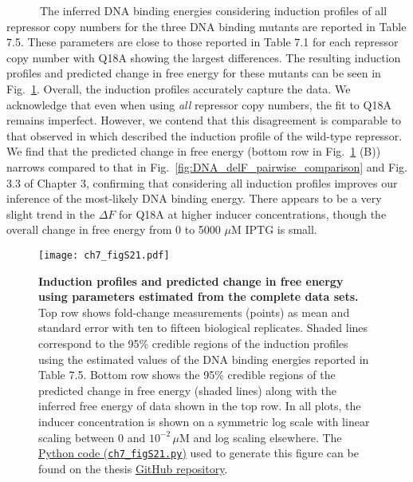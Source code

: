 \documentclass[12pt]{caltech_thesis}
\begin{document}
~~~~~~The inferred DNA binding energies considering induction profiles
of all repressor copy numbers for the three DNA binding mutants are
reported in Table 7.5. These parameters are close to those reported in
Table 7.1 for each repressor copy number with Q18A showing the largest
differences. The resulting induction profiles and predicted change in
free energy for these mutants can be seen in
Fig.~\ref{fig:global_DNA_profiles}. Overall, the induction profiles
accurately capture the data. We acknowledge that even when using
\emph{all} repressor copy numbers, the fit to Q18A remains imperfect.
However, we contend that this disagreement is comparable to that
observed in \textcite{razo-mejia2018} which described the induction
profile of the wild-type repressor. We find that the predicted change in
free energy (bottom row in Fig.~\ref{fig:global_DNA_profiles} (B))
narrows compared to that in Fig.~\ref{fig:DNA_delF_pairwise_comparison}
and Fig. 3.3 of Chapter 3, confirming that considering all induction
profiles improves our inference of the most-likely DNA binding energy.
There appears to be a very slight trend in the \(\Delta F\) for Q18A at
higher inducer concentrations, though the overall change in free energy
from 0 to 5000 \(\mu\)M IPTG is small.

\hypertarget{fig:global_DNA_profiles}{%
\begin{figure}
\centering
\texttt{[image: ch7\_figS21.pdf]}
\caption[{Induction profiles and predicted change in free energy using
parameters estimated from the complete data sets.}]{\textbf{Induction
profiles and predicted change in free energy using parameters estimated
from the complete data sets.} Top row shows fold-change measurements
(points) as mean and standard error with ten to fifteen biological
replicates. Shaded lines correspond to the 95\% credible regions of the
induction profiles using the estimated values of the DNA binding
energies reported in Table 7.5. Bottom row shows the 95\% credible
regions of the predicted change in free energy (shaded lines) along with
the inferred free energy of data shown in the top row. In all plots, the
inducer concentration is shown on a symmetric log scale with linear
scaling between 0 and \(10^{-2}\,\mu\)M and log scaling elsewhere. The
\href{https://github.com/gchure/phd/blob/master/src/chapter_07/code/ch7_figS21.py}{Python
code (\texttt{ch7\_figS21.py})} used to generate this figure can be
found on the thesis \href{https://github.com/gchure/phd}{GitHub
repository}.}
\label{fig:global_DNA_profiles}
\end{figure}
}
\end{document}

